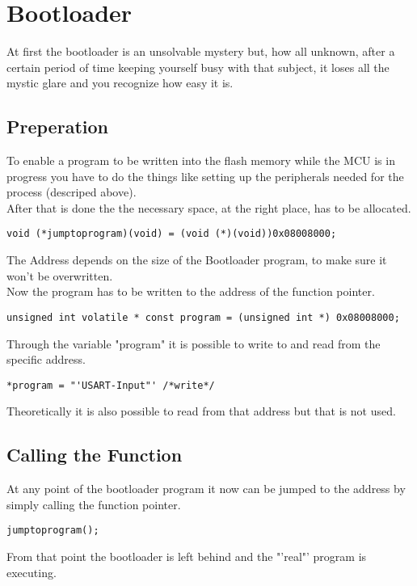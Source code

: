 \chapter{Bootloader}
At first the bootloader is an unsolvable mystery but, how all unknown, after a
certain period of time keeping yourself busy with that subject, it loses all the
mystic glare and you recognize how easy it is.\\

\section{Preperation}
To enable a program to be written into the flash memory while the MCU is in
progress you have to do the things like setting up the peripherals needed for 
the process (descriped above).\\
After that is done the the necessary space, at the right place, has to be
allocated.

\begin{lstlisting}
void (*jumptoprogram)(void) = (void (*)(void))0x08008000;
\end{lstlisting}
The Address depends on the size of the Bootloader program, to make sure it won't
be overwritten.\\
Now the program has to be written to the address of the function pointer.
\begin{lstlisting}
unsigned int volatile * const program = (unsigned int *) 0x08008000;
\end{lstlisting}
Through the variable "program" it is possible to write to and read from
the specific address.
\begin{lstlisting}
*program = "'USART-Input"' /*write*/
\end{lstlisting}
Theoretically it is also possible to read from that address but that is not
used.
\section{Calling the Function}
At any point of the bootloader program it now can be jumped to the address
 by simply calling the function pointer.
\begin{lstlisting}
jumptoprogram();
\end{lstlisting}

From that point the bootloader is left behind and the "'real"' program is 
executing.
